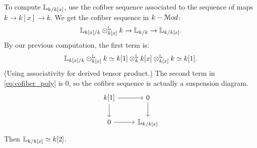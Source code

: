 \documentclass[10pt,a4paper,reqno,oneside]{book} %
\theoremstyle{plain}
\theoremstyle{definition}
\theoremstyle{remark}
\numberwithin{equation}{section}
\begin{document}
To compute $\mathbb L_{k/k[x]}$, use the cofiber sequence associated to the sequence of maps $k \to k[x] \to k$. We get the
cofiber sequence in $k-\mathcal M od$:
\begin{equation}
\label{eq:cofiber_poly}
	\mathbb L_{k[x]/k} \otimes^{\mathbb L}_{k[x]} k \to \mathbb L_{k/k} \to \mathbb L_{k/k[x]}.
\end{equation}
By our previous computation, the first term is:
\[ \mathbb L_{k[x]/k} \otimes^{\mathbb L}_{k[x]} k \simeq k[1] \otimes_k^{\mathbb L} k[x] \otimes^{\mathbb L}_{k[x]} k \simeq k[1].	\]
(Using associativity for derived tensor product.) The second term in \ref{eq:cofiber_poly} is 0, so the cofiber sequence
is actually a suspension diagram. 
\[
\begin{tikzcd}
k[1]\arrow{r}\arrow{d} & 0\arrow{d} \\
0\arrow{r} & \bbL_{k/k[x]}
\end{tikzcd}
\]
Then $\mathbb L_{k/k[x]}\simeq k[2]$. 
\end{document}
